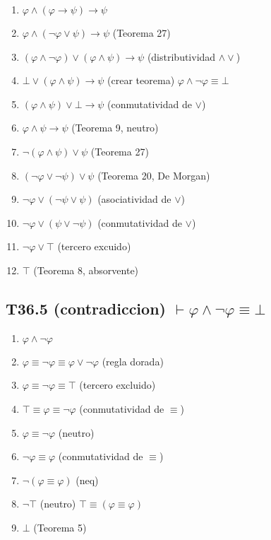 \documentclass[a4paper,11pt]{article}
\begin{document}
\begin{enumerate}
    \item $\varphi \land (\varphi \rightarrow \psi) \rightarrow \psi$
    \item $\varphi \land (\neg\varphi \lor \psi) \rightarrow \psi$ \hfill (Teorema 27)
    \item $(\varphi \land \neg\varphi) \lor (\varphi \land \psi) \rightarrow \psi$ \hfill (distributividad $\land\lor$)
    \item $\bot \lor (\varphi \land \psi) \rightarrow \psi$ \hfill (crear teorema) $\varphi \land \neg\varphi \equiv \bot$
    \item $(\varphi \land \psi) \lor \bot \rightarrow \psi$ \hfill (conmutatividad de $\lor$)
    \item $\varphi \land \psi \rightarrow \psi$ \hfill (Teorema 9, neutro)
    \item $\neg(\varphi \land \psi) \lor \psi$ \hfill (Teorema 27)
    \item $(\neg\varphi \lor \neg\psi) \lor \psi$ \hfill (Teorema 20, De Morgan)
    \item $\neg\varphi \lor (\neg\psi \lor \psi)$ \hfill (asociatividad de $\lor$)
    \item $\neg\varphi \lor (\psi \lor \neg\psi)$ \hfill (conmutatividad de $\lor$)
    \item $\neg\varphi \lor \top$ \hfill (tercero excuido)
    \item $\top$ \hfill (Teorema 8, absorvente)
\end{enumerate}

\subsection{T36.5 (contradiccion) $\vdash \varphi \land \neg\varphi \equiv \bot$}

\begin{enumerate}
    \item $\varphi \land \neg\varphi$
    \item $\varphi \equiv \neg\varphi \equiv \varphi \lor \neg\varphi$ \hfill (regla dorada)
    \item $\varphi \equiv \neg\varphi \equiv \top$ \hfill (tercero excluido)
    \item $\top \equiv \varphi \equiv \neg\varphi$ \hfill (conmutatividad de $\equiv$)
    \item $\varphi \equiv \neg\varphi$ \hfill (neutro)
    \item $\neg\varphi \equiv \varphi$ \hfill (conmutatividad de $\equiv$)
    \item $\neg(\varphi \equiv \varphi)$ \hfill (neq)
    \item $\neg\top$ \hfill (neutro) $\top \equiv (\varphi \equiv \varphi)$
    \item $\bot$ \hfill (Teorema 5)
\end{enumerate}
\end{document}
